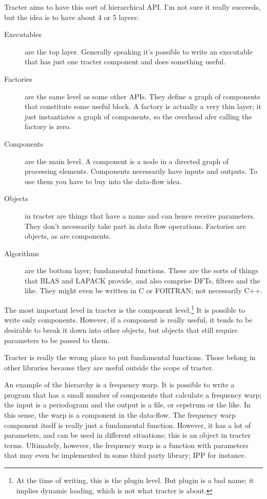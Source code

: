 Tracter aims to have this sort of hierarchical API.  I'm not sure it
really succeeds, but the idea is to have about 4 or 5 layers:
\begin{description}
\item[Executables] are the top layer.  Generally speaking it's
  possible to write an executable that has just one tracter component
  and does something useful.
\item[Factories] are the same level as some other APIs.  They define a
  graph of components that constitute some useful block.  A factory is
  actually a very thin layer; it just instantiates a graph of
  components, so the overhead afer calling the factory is zero.
\item[Components] are the main level.  A component is a node in a
  directed graph of processing elements.  Components necessarily have
  inputs and outputs.  To use them you have to buy into the data-flow
  idea.
\item[Objects] in tracter are things that have a name and can hence
  receive parameters.  They don't necessarily take part in data flow
  operations.  Factories are objects, as are components.
\item[Algorithms] are the bottom layer; fundamental functions.  These
  are the sorts of things that BLAS and LAPACK provide, and also
  comprise DFTs, filters and the like.  They might even be written in
  C or FORTRAN; not necessarily C++.
\end{description}

The most important level in tracter is the component
level.\footnote{At the time of writing, this is the plugin level.  But
  plugin is a bad name; it implies dynamic loading, which is not what
  tracter is about.}  It is possible to write only components.
However, if a component is really useful, it tends to be desirable to
break it down into other objects, but objects that still require
parameters to be passed to them.

Tracter is really the wrong place to put fundamental functions.  Those
belong in other libraries because they are useful outside the scope of
tracter.

An example of the hierarchy is a frequency warp.  It is possible to
write a program that has a small number of components that calculate a
frequency warp; the input is a periodogram and the output is a file,
or cepstrum or the like.  In this sense, the warp is a component in
the data-flow.  The frequency warp component itself is really just a
fundamental function.  However, it has a lot of parameters, and can be
used in different situations; this is an object in tracter terms.
Ultimately, however, the frequency warp is a function with parameters
that may even be implemented in some third party library; IPP for
instance.

